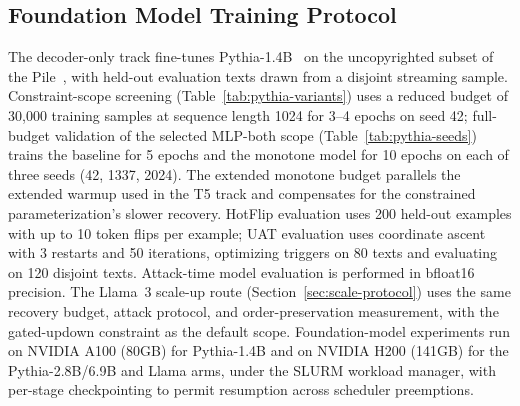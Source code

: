 \documentclass{article}
\theoremstyle{plain}
\theoremstyle{definition}
\theoremstyle{remark}
\begin{document}
\subsection{Foundation Model Training Protocol}
\label{app:pythia}
The decoder-only track fine-tunes Pythia-1.4B~\cite{biderman2023pythia} on the uncopyrighted subset of the Pile~\cite{gao2020pile}, with held-out evaluation texts drawn from a disjoint streaming sample. Constraint-scope screening (Table~\ref{tab:pythia-variants}) uses a reduced budget of 30{,}000 training samples at sequence length 1024 for 3--4 epochs on seed 42; full-budget validation of the selected MLP-both scope (Table~\ref{tab:pythia-seeds}) trains the baseline for 5 epochs and the monotone model for 10 epochs on each of three seeds (42, 1337, 2024). The extended monotone budget parallels the extended warmup used in the T5 track and compensates for the constrained parameterization's slower recovery. HotFlip evaluation uses 200 held-out examples with up to 10 token flips per example; UAT evaluation uses coordinate ascent with 3 restarts and 50 iterations, optimizing triggers on 80 texts and evaluating on 120 disjoint texts. Attack-time model evaluation is performed in bfloat16 precision. The Llama~3 scale-up route (Section~\ref{sec:scale-protocol}) uses the same recovery budget, attack protocol, and order-preservation measurement, with the gated-updown constraint as the default scope. Foundation-model experiments run on NVIDIA A100 (80GB) for Pythia-1.4B and on NVIDIA H200 (141GB) for the Pythia-2.8B/6.9B and Llama arms, under the SLURM workload manager, with per-stage checkpointing to permit resumption across scheduler preemptions.


\end{document}
